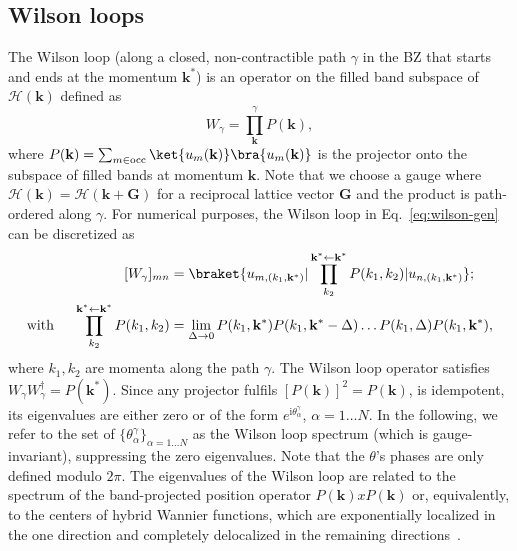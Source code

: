 \subsection{Wilson loops}
The Wilson loop (along a closed, non-contractible path $\gamma$ in the BZ that starts and ends at the momentum $\mathbf{k}^*$) is an operator on the filled band subspace of $\mathcal{H}(\mathbf{k})$ defined as
\begin{equation}
W_\gamma = \prod_{\mathbf{k}}^{\gamma} P(\mathbf{k}),
\label{eq:wilson-gen}
\end{equation}
where $P(\mathbf{k})= \sum_{m \in \mathrm{occ}} \ket{u_m(\mathbf{k})}\bra{u_m(\mathbf{k})}$ is the projector onto the subspace of filled bands at momentum $\mathbf{k}$. Note that we choose a gauge where $\mathcal{H}(\mathbf{k}) = \mathcal{H}(\mathbf{k}+\mathbf{G})$ for a reciprocal lattice vector $\mathbf{G}$ and the product is path-ordered along $\gamma$. For numerical purposes, the Wilson loop in Eq.~\eqref{eq:wilson-gen} can be discretized as
\begin{equation}
\begin{aligned}
[W_\gamma]_{mn} &= \braket{ u_{m, (k_1, \mathbf{k}^*) } | \prod_{k_2}^{\mathbf{k}^* \leftarrow \mathbf{k}^*} P(k_1, k_2) | u_{n, (k_1, \mathbf{k}^*) }}; \\
\mathrm{with} \hspace*{0.5cm }\prod_{k_2}^{\mathbf{k}^* \leftarrow \mathbf{k}^*} P(k_1, k_2) &= \lim_{\Delta \rightarrow 0} P(k_1, \mathbf{k}^*) P(k_1, \mathbf{k}^* - \Delta) \ldots P(k_1, \Delta) P(k_1, \mathbf{k}^*),
\end{aligned}
\end{equation}
where $k_1, k_2$ are momenta along the path $\gamma$. The Wilson loop operator satisfies $W_\gamma W_\gamma^\dagger = P(\mathbf{k}^*)$. Since any projector fulfils $[P(\mathbf{k})]^2 = P(\mathbf{k})$, \ie is idempotent, its eigenvalues are either zero or of the form $e^{\mathrm{i} \theta_\alpha^\gamma}$, $\alpha = 1 \dots N$. In the following, we refer to the set of $\{\theta_\alpha^\gamma\}_{\alpha = 1 \dots N}$ as the Wilson loop spectrum (which is gauge-invariant), suppressing the zero eigenvalues. Note that the $\theta$'s phases are only defined modulo $2 \pi$. The eigenvalues of the Wilson loop are related to the spectrum of the band-projected position operator $P (\mathbf{k}) x P (\mathbf{k})$ or, equivalently, to the centers of hybrid Wannier functions, which are exponentially localized in the one direction and completely delocalized in the remaining directions~\cite{PhysRevB.89.155114}.

